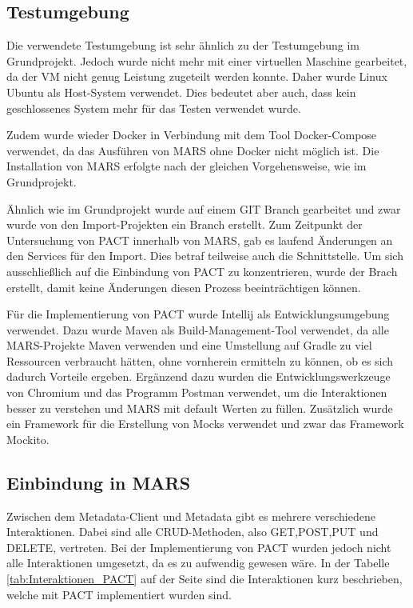 \documentclass{llncs}
\begin{document}
\subsection{Testumgebung}
Die verwendete Testumgebung ist sehr ähnlich zu der Testumgebung im Grundprojekt. Jedoch wurde nicht mehr mit einer virtuellen Maschine gearbeitet, da der VM nicht genug Leistung zugeteilt werden konnte. Daher wurde Linux Ubuntu als Host-System verwendet. Dies bedeutet aber auch, dass kein geschlossenes System mehr für das Testen verwendet wurde. 

Zudem wurde wieder Docker in Verbindung mit dem Tool Docker-Compose verwendet, da das Ausführen von MARS ohne Docker nicht möglich ist. Die Installation von MARS erfolgte nach der gleichen Vorgehensweise, wie im Grundprojekt. 

Ähnlich wie im Grundprojekt wurde auf einem GIT Branch gearbeitet und zwar wurde von den Import-Projekten ein Branch erstellt. Zum Zeitpunkt der Untersuchung von PACT innerhalb von MARS, gab es laufend Änderungen an den Services für den Import. Dies betraf teilweise auch die Schnittstelle. Um sich ausschließlich auf die Einbindung von PACT zu konzentrieren, wurde der Brach erstellt, damit keine Änderungen diesen Prozess beeinträchtigen können.

Für die Implementierung von PACT wurde Intellij als Entwicklungsumgebung verwendet. Dazu wurde Maven als Build-Management-Tool verwendet, da alle MARS-Projekte Maven verwenden und eine Umstellung auf Gradle zu viel Ressourcen verbraucht hätten, ohne vornherein ermitteln zu können, ob es sich dadurch Vorteile ergeben. Ergänzend dazu wurden die Entwicklungswerkzeuge von Chromium und das Programm Postman verwendet, um die Interaktionen besser zu verstehen und MARS mit default Werten zu füllen. Zusätzlich wurde ein Framework für die Erstellung von Mocks verwendet und zwar das Framework Mockito.

\subsection{Einbindung in MARS}
Zwischen dem Metadata-Client und Metadata gibt es mehrere verschiedene Interaktionen. Dabei sind alle CRUD-Methoden, also GET,POST,PUT und DELETE, vertreten. Bei der Implementierung von PACT wurden jedoch nicht alle Interaktionen umgesetzt, da es zu aufwendig gewesen wäre. In der Tabelle \ref{tab:Interaktionen_PACT} auf der Seite \pageref{tab:Interaktionen_PACT} sind die Interaktionen kurz beschrieben, welche mit PACT implementiert wurden sind.
\end{document}
